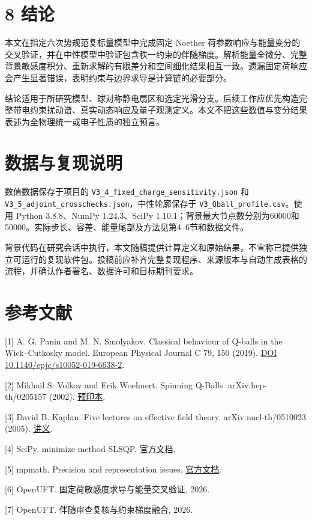 \documentclass[UTF8,fontset=fandol,11pt]{ctexart}
\begin{document}
\section*{8 结论}

本文在指定六次势规范复标量模型中完成固定 Noether 荷参数响应与能量变分的交叉验证，并在中性模型中验证包含秩一约束的伴随梯度。解析能量全微分、完整背景敏感度积分、重新求解的有限差分和空间细化结果相互一致。遗漏固定荷响应会产生显著错误，表明约束与边界求导是计算链的必要部分。

结论适用于所研究模型、球对称静电扇区和选定光滑分支。后续工作应优先构造完整带电约束扰动谱、真实动态响应及量子观测定义。本文不把这些数值与变分结果表述为全物理统一或电子性质的独立预言。

\section*{数据与复现说明}

数值数据保存于项目的 \texttt{V3\_4\_fixed\_charge\_sensitivity.json} 和 \texttt{V3\_5\_adjoint\_crosschecks.json}，中性轮廓保存于 \texttt{V3\_Qball\_profile.csv}。使用 Python 3.8.8、NumPy 1.24.3、SciPy 1.10.1；背景最大节点数分别为60000和50000。实际步长、容差、能量尾部及方法见第4–6节和数据文件。

背景代码在研究会话中执行，本文随稿提供计算定义和原始结果，不宣称已提供独立可运行的复现软件包。投稿前应补齐完整复现程序、来源版本与自动生成表格的流程，并确认作者署名、数据许可和目标期刊要求。

\section*{参考文献}

[1] A. G. Panin and M. N. Smolyakov. Classical behaviour of Q-balls in the Wick–Cutkosky model. European Physical Journal C 79, 150 (2019). \href{https://link.springer.com/article/10.1140/epjc/s10052-019-6638-2}{DOI 10.1140/epjc/s10052-019-6638-2}.

[2] Mikhail S. Volkov and Erik Woehnert. Spinning Q-Balls. arXiv:hep-th/0205157 (2002). \href{https://arxiv.org/abs/hep-th/0205157}{预印本}.

[3] David B. Kaplan. Five lectures on effective field theory. arXiv:nucl-th/0510023 (2005). \href{https://arxiv.org/abs/nucl-th/0510023}{讲义}.

[4] SciPy. minimize method SLSQP. \href{https://docs.scipy.org/doc/scipy/reference/optimize.minimize-slsqp.html}{官方文档}.

[5] mpmath. Precision and representation issues. \href{https://www.mpmath.org/doc/current/technical.html}{官方文档}.

[6] OpenUFT. 固定荷敏感度求导与能量交叉验证, 2026.

[7] OpenUFT. 伴随审查复核与约束梯度融合, 2026.
\end{document}
